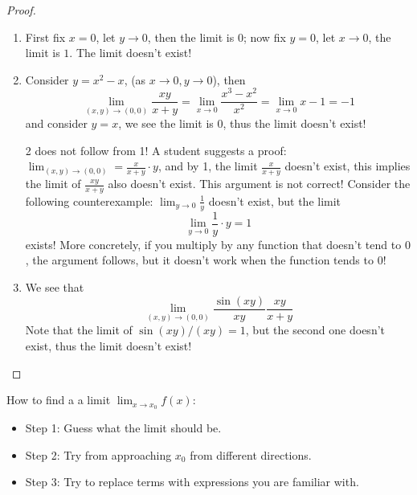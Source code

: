 \documentclass[openany]{book}
\begin{document}
\begin{proof}
    \begin{enumerate}
        \item First fix $x=0$, let $y\to 0$, then the limit is $0$; now fix $y=0$, let $x\to 0$, the limit is $1$. The limit doesn't exist!
        \item Consider $y=x^2-x$, (as $x\to0, y\to 0$), then 
        \begin{equation*}
            \lim_{(x,y)\to(0,0)}\frac{xy}{x+y}=\lim_{x\to 0}\frac{x^3-x^2}{x^2}=\lim_{x\to 0}x-1=-1
        \end{equation*}
        and consider $y=x$, we see the limit is $0$, thus the limit doesn't exist!
        \begin{warn}
            2 does not follow from 1! A student suggests a proof: $\lim_{(x,y)\to(0,0)}=\frac{x}{x+y}\cdot y$, and by 1, the limit $\frac{x}{x+y}$ doesn't exist, this implies the limit of $\frac{xy}{x+y}$ also doesn't exist. This argument is not correct! Consider the following counterexample: $\lim_{y\to 0}\frac{1}{y}$ doesn't exist, but the limit
            \begin{equation*}
                \lim_{y\to 0}\frac{1}{y}\cdot y=1
            \end{equation*}
            exists! More concretely, if you multiply by any function that doesn't tend to $0$, the argument follows, but it doesn't work when the function tends to $0$!
        \end{warn}
        \item We see that 
        \begin{equation*}
            \lim_{(x,y)\to(0,0)}\frac{\sin(xy)}{xy}\frac{xy}{x+y}
        \end{equation*}
        Note that the limit of $\sin(xy)/(xy)=1$, but the second one doesn't exist, thus the limit doesn't exist!
    \end{enumerate}
\end{proof}


\noindent
\begin{idea}
How to find a a limit $\lim_{x\to x_0}f(x)$:
\begin{itemize}
    \item Step 1: Guess what the limit should be.
    \item Step 2: Try from approaching $x_0$ from different directions.
    \item Step 3: Try to replace terms with expressions you are familiar with.
\end{itemize}
\end{idea}
\end{document}
